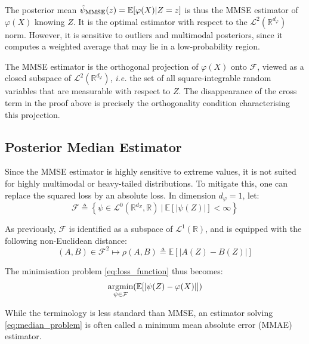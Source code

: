 The posterior mean $\hat{\psi}_{\textup{MMSE}}(z)=\mathbb{E}[\varphi(X)|Z=z]$ is thus the MMSE estimator of $\varphi(X)$ knowing $Z$. It is the optimal estimator with respect to the $\mathcal{L}^2\left(\mathbb{R}^{d_{\varphi}}\right)$ norm. However, it is sensitive to outliers and multimodal posteriors, since it computes a weighted average that may lie in a low-probability region.

\begin{remark}
	The MMSE estimator is the orthogonal projection of $\varphi(X)$ onto $\mathcal{F}$, viewed as a closed subspace of $\mathcal{L}^2\left(\mathbb{R}^{d_{\varphi}}\right)$, \textit{i.e.} the set of all square-integrable random variables that are measurable with respect to $Z$. The disappearance of the cross term in the proof above is precisely the orthogonality condition characterising this projection.
\end{remark}

\subsection{Posterior Median Estimator}

Since the MMSE estimator is highly sensitive to extreme values, it is not suited for highly multimodal or heavy-tailed distributions. To mitigate this, one can replace the squared loss by an absolute loss. In dimension $d_{\varphi}=1$, let:
\begin{equation}
	\mathcal{F}\triangleq\left\{\psi\in\mathcal{L}^0\left(\mathbb{R}^{d_Z},\mathbb{R}\right)\:|\:\mathbb{E}[|\psi(Z)|]<\infty\right\}
\end{equation}

As previously, $\mathcal{F}$ is identified as a subspace of $\mathcal{L}^1(\mathbb{R})$, and is equipped with the following non-Euclidean distance:
\begin{equation}
	(A,B)\in\mathcal{F}^2\mapsto\rho(A,B)\triangleq\mathbb{E}[|A(Z)-B(Z)|]
\end{equation}

The minimisation problem \eqref{eq:loss_function} thus becomes:
\begin{equation}
	\underset{\psi\in\mathcal{F}}{\textup{argmin}}(\mathbb{E}[|\psi(Z)-\varphi(X)|])\label{eq:median_problem}
\end{equation}

While the terminology is less standard than MMSE, an estimator solving \eqref{eq:median_problem} is often called a minimum mean absolute error (MMAE) estimator.

